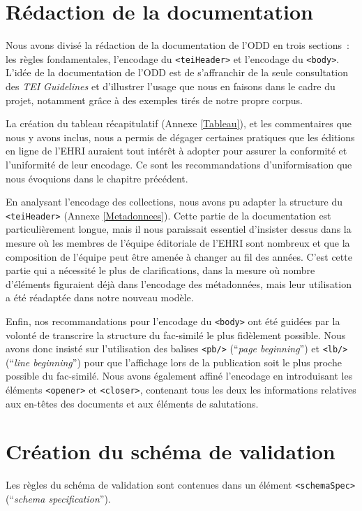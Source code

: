 \section{Rédaction de la documentation}
Nous avons divisé la rédaction de la documentation de l'ODD en trois sections~: les règles fondamentales, l'encodage du \texttt{<teiHeader>} et l'encodage du \texttt{<body>}. L'idée de la documentation de l'ODD est de s'affranchir de la seule consultation des \textit{TEI Guidelines} et d'illustrer l'usage que nous en faisons dans le cadre du projet, notamment grâce à des exemples tirés de notre propre corpus.  

La création du tableau récapitulatif (Annexe \ref{Tableau}), et les commentaires que nous y avons inclus, nous a permis de dégager certaines pratiques que les éditions en ligne de l'EHRI auraient tout intérêt à adopter pour assurer la conformité et l'uniformité de leur encodage. Ce sont les recommandations d'uniformisation que nous évoquions dans le chapitre précédent.  

En analysant l'encodage des collections, nous avons pu adapter la structure du \texttt{<teiHeader>} (Annexe \ref{Metadonnees}). Cette partie de la documentation est particulièrement longue, mais il nous paraissait essentiel d'insister dessus dans la mesure où les membres de l'équipe éditoriale de l'EHRI sont nombreux et que la composition de l'équipe peut être amenée à changer au fil des années. C'est cette partie qui a nécessité le plus de clarifications, dans la mesure où nombre d'éléments figuraient déjà dans l'encodage des métadonnées, mais leur utilisation a été réadaptée dans notre nouveau modèle.  

Enfin, nos recommandations pour l'encodage du \texttt{<body>} ont été guidées par la volonté de transcrire la structure du fac-similé le plus fidèlement possible. Nous avons donc insisté sur l'utilisation des balises \texttt{<pb/>} (\enquote{\textit{page beginning}}) et \texttt{<lb/>} (\enquote{\textit{line beginning}}) pour que l'affichage lors de la publication soit le plus proche possible du fac-similé. Nous avons également affiné l'encodage en introduisant les éléments \texttt{<opener>} et \texttt{<closer>}, contenant tous les deux les informations relatives aux en-têtes des documents et aux éléments de salutations.



\section{Création du schéma de validation}
Les règles du schéma de validation sont contenues dans un élément \texttt{<schemaSpec>} (\enquote{\textit{schema specification}}).  


